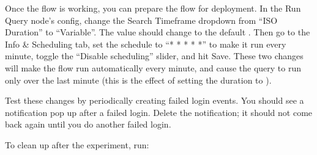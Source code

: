 Once the flow is working, you can prepare the flow for deployment.  In the Run Query node's config, change the Search Timeframe dropdown from ``ISO Duration'' to ``Variable''. The value should change to the default . Then go to the Info \& Scheduling tab, set the schedule to ``* * * * *'' to make it run every minute, toggle the ``Disable scheduling'' slider, and hit Save. These two changes will make the flow run automatically every minute, and cause the query to run only over the last minute (this is the effect of setting the duration to ).

Test these changes by periodically creating failed login events. You should see a notification pop up after a failed login. Delete the notification; it should not come back again until you do another failed login.

To clean up after the experiment, run:

